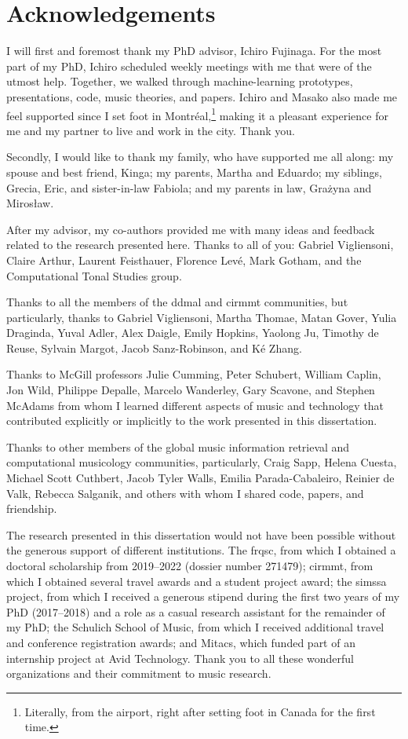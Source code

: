 \chapter*{Acknowledgements}
\label{chap:acknowledgements}

I will first and foremost thank my PhD advisor, Ichiro
Fujinaga. For the most part of my PhD, Ichiro scheduled
weekly meetings with me that were of the utmost help.
Together, we walked through machine-learning prototypes,
presentations, code, music theories, and papers. Ichiro and
Masako also made me feel supported since I set foot in
Montr\'eal,\footnote{Literally, from the airport, right
after setting foot in Canada for the first time.} making it
a pleasant experience for me and my partner to live and work
in the city. Thank you.

Secondly, I would like to thank my family, who have
supported me all along: my spouse and best friend, Kinga; my
parents, Martha and Eduardo; my siblings, Grecia, Eric, and
sister-in-law Fabiola; and my parents in law, Gra\.zyna and
Miros\l{}aw.

After my advisor, my co-authors provided me with many ideas
and feedback related to the research presented here. Thanks
to all of you: Gabriel Vigliensoni, Claire Arthur, Laurent
Feisthauer, Florence Lev\'e, Mark Gotham, and the
Computational Tonal Studies group.

Thanks to all the members of the \gls{ddmal} and
\gls{cirmmt} communities, but particularly, thanks to
Gabriel Vigliensoni, Martha Thomae, Matan Gover, Yulia
Draginda, Yuval Adler, Alex Daigle, Emily Hopkins, Yaolong
Ju, Timothy de Reuse, Sylvain Margot, Jacob Sanz-Robinson,
and K\'e Zhang.

Thanks to McGill professors Julie Cumming, Peter Schubert,
William Caplin, Jon Wild, Philippe Depalle, Marcelo
Wanderley, Gary Scavone, and Stephen McAdams from whom I
learned different aspects of music and technology that
contributed explicitly or implicitly to the work presented
in this dissertation.

Thanks to other members of the global music information
retrieval and computational musicology communities,
particularly, Craig Sapp, Helena Cuesta, Michael Scott
Cuthbert, Jacob Tyler Walls, Emilia Parada-Cabaleiro,
Reinier de Valk, Rebecca Salganik, and others with whom I
shared code, papers, and friendship.

The research presented in this dissertation would not have
been possible without the generous support of different
institutions. The \gls{frqsc}, from which I obtained a
doctoral scholarship from 2019--2022 (dossier number
271479); \gls{cirmmt}, from which I obtained several travel
awards and a student project award; the \gls{simssa}
project, from which I received a generous stipend during the
first two years of my PhD (2017--2018) and a role as a
casual research assistant for the remainder of my PhD; the
Schulich School of Music, from which I received additional
travel and conference registration awards; and Mitacs, which
funded part of an internship project at Avid Technology.
Thank you to all these wonderful organizations and their
commitment to music research.

